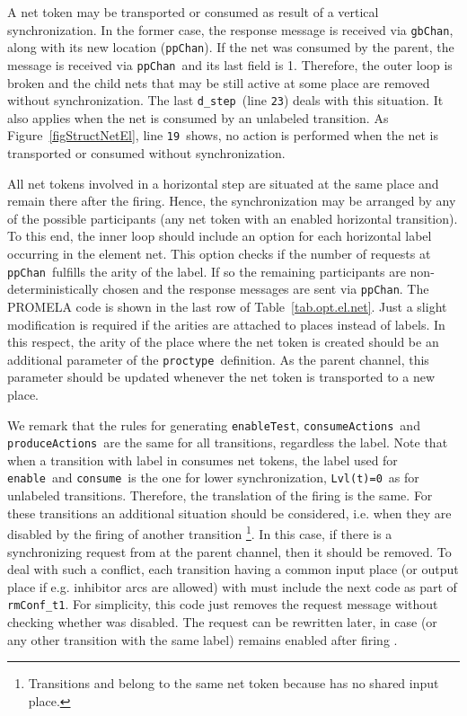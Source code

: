 \documentclass{llncs}
\begin{document}
A net token may be transported or consumed as result of a vertical synchronization. In the former case, the response message is received via \small\verb"gbChan"\nfont, along with its new location (\small\verb"ppChan"\nfont). If the net was consumed by the parent, the message is received via \small\verb"ppChan"\nfont\  and its last field is 1. Therefore, the outer loop is broken and the child nets that may be still active at some place are removed without synchronization. The last \small\verb"d_step"\nfont\ (line \small\verb"23"\nfont) deals with this situation.
It also applies when the net is consumed by an unlabeled transition.  As Figure~\ref{figStructNetEl}, line \small\verb"19"\nfont\ shows, no action is performed when the net is transported or consumed without synchronization.

All net tokens involved in a horizontal step are situated at the same place and remain there after the firing. Hence, the synchronization may be arranged by any of the possible participants (any net token with an enabled horizontal transition). To this end, the inner loop should include an option for each horizontal label occurring in the element net.  This option checks if the number of requests at \small\verb"ppChan"\nfont\  fulfills the arity of the label. If so the remaining participants are non-deterministically chosen and the response messages are sent via \small\verb"ppChan"\nfont. The PROMELA code is shown in the last row of Table~\ref{tab.opt.el.net}. Just a slight modification is required if the arities are attached to places instead of labels. In this respect, the arity of the place where the net token is created should be an additional parameter of the \small\verb"proctype"\nfont\  definition. As the parent channel, this parameter should be updated whenever the net token is transported to a new place.

We  remark that the rules for generating \small\verb"enableTest"\nfont, \small\verb"consumeActions"\nfont\ and \small\verb"produceActions"\nfont\ are the same for all transitions, regardless the label. Note that when a transition  with label in  consumes net tokens, the label used for \small\verb"enable"\nfont\  and \small\verb"consume"\nfont\ is the one for lower synchronization, \small\verb"Lvl(t)=0"\nfont\ as for unlabeled transitions. Therefore, the translation of the firing is the same. For these transitions an additional situation should be considered, i.e. when they are disabled by the firing of another transition \footnote{Transitions  and  belong to the same net token because  has no shared input place.}. In this case, if there is a synchronizing request from  at the parent channel, then it should be removed. To deal with such a conflict, each transition  having a common input place (or output place if e.g. inhibitor arcs are allowed) with  must include the next code as part of \small\verb"rmConf_t1"\nfont. For simplicity, this code just removes the request message without checking whether  was disabled. The request can be rewritten later, in case  (or any other transition with the same label) remains enabled after firing .
\end{document}
